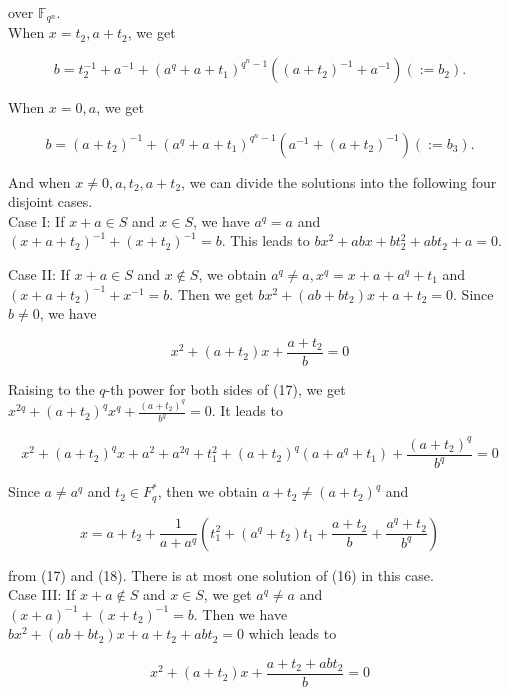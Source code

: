 \documentclass[10pt]{article}
\begin{document}
over $\mathbb{F}_{q^{n}}$.\\
When $x=t_{2}, a+t_{2}$, we get

$$
b=t_{2}^{-1}+a^{-1}+\left(a^{q}+a+t_{1}\right)^{q^{n}-1}\left(\left(a+t_{2}\right)^{-1}+a^{-1}\right)\left(:=b_{2}\right) .
$$

When $x=0, a$, we get

$$
b=\left(a+t_{2}\right)^{-1}+\left(a^{q}+a+t_{1}\right)^{q^{n}-1}\left(a^{-1}+\left(a+t_{2}\right)^{-1}\right)\left(:=b_{3}\right) .
$$

And when $x \neq 0, a, t_{2}, a+t_{2}$, we can divide the solutions into the following four disjoint cases.\\
Case I: If $x+a \in S$ and $x \in S$, we have $a^{q}=a$ and $\left(x+a+t_{2}\right)^{-1}+\left(x+t_{2}\right)^{-1}=b$. This leads to $b x^{2}+a b x+b t_{2}^{2}+a b t_{2}+a=0$.

Case II: If $x+a \in S$ and $x \notin S$, we obtain $a^{q} \neq a, x^{q}=x+a+a^{q}+t_{1}$ and $\left(x+a+t_{2}\right)^{-1}+x^{-1}=b$. Then we get $b x^{2}+\left(a b+b t_{2}\right) x+a+t_{2}=0$. Since $b \neq 0$, we have


\begin{equation*}
x^{2}+\left(a+t_{2}\right) x+\frac{a+t_{2}}{b}=0 \tag{17}
\end{equation*}


Raising to the $q$-th power for both sides of (17), we get $x^{2 q}+\left(a+t_{2}\right)^{q} x^{q}+\frac{\left(a+t_{2}\right)^{q}}{b^{q}}=0$. It leads to


\begin{equation*}
x^{2}+\left(a+t_{2}\right)^{q} x+a^{2}+a^{2 q}+t_{1}^{2}+\left(a+t_{2}\right)^{q}\left(a+a^{q}+t_{1}\right)+\frac{\left(a+t_{2}\right)^{q}}{b^{q}}=0 \tag{18}
\end{equation*}


Since $a \neq a^{q}$ and $t_{2} \in F_{q}^{*}$, then we obtain $a+t_{2} \neq\left(a+t_{2}\right)^{q}$ and

$$
x=a+t_{2}+\frac{1}{a+a^{q}}\left(t_{1}^{2}+\left(a^{q}+t_{2}\right) t_{1}+\frac{a+t_{2}}{b}+\frac{a^{q}+t_{2}}{b^{q}}\right)
$$

from (17) and (18). There is at most one solution of (16) in this case.\\
Case III: If $x+a \notin S$ and $x \in S$, we get $a^{q} \neq a$ and $(x+a)^{-1}+\left(x+t_{2}\right)^{-1}=b$. Then we have $b x^{2}+\left(a b+b t_{2}\right) x+a+t_{2}+a b t_{2}=0$ which leads to


\begin{equation*}
x^{2}+\left(a+t_{2}\right) x+\frac{a+t_{2}+a b t_{2}}{b}=0 \tag{19}
\end{equation*}
\end{document}
